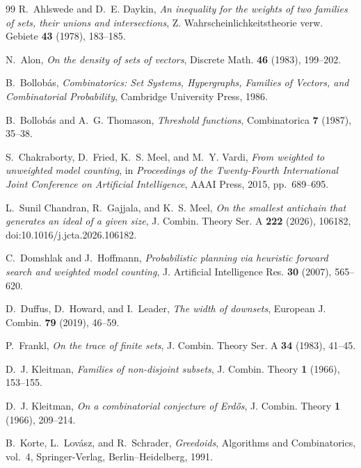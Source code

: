 \documentclass[11pt]{article}
\theoremstyle{definition}
\theoremstyle{remark}
\begin{document}
\begin{thebibliography}{99}
R.~Ahlswede and D.~E. Daykin,
\emph{An inequality for the weights of two families of sets, their unions and intersections},
Z. Wahrscheinlichkeitstheorie verw. Gebiete \textbf{43} (1978), 183--185.

N.~Alon,
\emph{On the density of sets of vectors},
Discrete Math. \textbf{46} (1983), 199--202.

B.~Bollob\'as,
\emph{Combinatorics: Set Systems, Hypergraphs, Families of Vectors, and Combinatorial Probability},
Cambridge University Press, 1986.

B.~Bollob\'as and A.~G. Thomason,
\emph{Threshold functions},
Combinatorica \textbf{7} (1987), 35--38.

S.~Chakraborty, D.~Fried, K.~S. Meel, and M.~Y. Vardi,
\emph{From weighted to unweighted model counting},
in \emph{Proceedings of the Twenty-Fourth International Joint Conference on Artificial Intelligence},
AAAI Press, 2015, pp.~689--695.

L.~Sunil Chandran, R.~Gajjala, and K.~S. Meel,
\emph{On the smallest antichain that generates an ideal of a given size},
J. Combin. Theory Ser. A \textbf{222} (2026), 106182,
doi:10.1016/j.jcta.2026.106182.

C.~Domshlak and J.~Hoffmann,
\emph{Probabilistic planning via heuristic forward search and weighted model counting},
J. Artificial Intelligence Res. \textbf{30} (2007), 565--620.

D.~Duffus, D.~Howard, and I.~Leader,
\emph{The width of downsets},
European J. Combin. \textbf{79} (2019), 46--59.

P.~Frankl,
\emph{On the trace of finite sets},
J. Combin. Theory Ser. A \textbf{34} (1983), 41--45.

D.~J. Kleitman,
\emph{Families of non-disjoint subsets},
J. Combin. Theory \textbf{1} (1966), 153--155.

D.~J. Kleitman,
\emph{On a combinatorial conjecture of Erd\H{o}s},
J. Combin. Theory \textbf{1} (1966), 209--214.

B.~Korte, L.~Lov\'asz, and R.~Schrader,
\emph{Greedoids}, Algorithms and Combinatorics, vol.~4,
Springer-Verlag, Berlin--Heidelberg, 1991.


\end{thebibliography}
\end{document}
